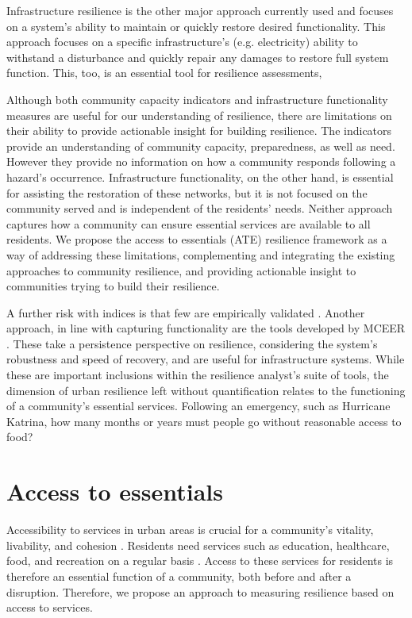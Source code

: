 \documentclass[9pt,twocolumn,twoside,lineno]{pnas-new}
\begin{document}
Infrastructure resilience is the other major approach currently used and focuses on a system’s ability to maintain or quickly restore desired functionality. This approach focuses on a specific infrastructure’s (e.g. electricity) ability to withstand a disturbance and quickly repair any damages to restore full system function. This, too, is an essential tool for resilience assessments, 

Although both community capacity indicators and infrastructure functionality measures are useful for our understanding of resilience, there are limitations on their ability to provide actionable insight for building resilience. The indicators provide an understanding of community capacity, preparedness, as well as need. However they provide no information on how a community responds following a hazard’s occurrence. Infrastructure functionality, on the other hand, is essential for assisting the restoration of these networks, but it is not focused on the community served and is independent of the residents’ needs. Neither approach captures how a community can ensure essential services are available to all residents. We propose the access to essentials (ATE) resilience framework as a way of addressing these limitations, complementing and integrating the existing approaches to community resilience, and providing actionable insight to communities trying to build their resilience. 

A further risk with indices is that few are empirically validated \cite{Bakkensen2016-ht}. Another approach, in line with capturing functionality are the tools developed by MCEER \cite{Vugrin2010-vy}. These take a persistence perspective on resilience, considering the system’s robustness and speed of recovery, and are useful for infrastructure systems. While these are important inclusions within the resilience analyst’s suite of tools, the dimension of urban resilience left without quantification relates to the functioning of a community’s essential services. Following an emergency, such as Hurricane Katrina, how many months or years must people go without reasonable access to food?


\section*{Access to essentials}
Accessibility to services in urban areas is crucial for a community’s vitality, livability, and cohesion \cite{Dempsey2011-og, Talen2003-dc}. Residents need services such as education, healthcare, food, and recreation on a regular basis \cite{Dempsey2011-og, Winter1997-kc, Talen2003-dc}. Access to these services for residents is therefore an essential function of a community, both before and after a disruption. Therefore, we propose an approach to measuring resilience based on access to services.
\end{document}

